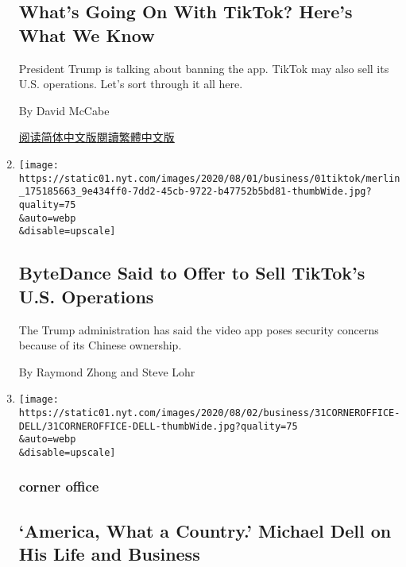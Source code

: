 \begin{enumerate}
{  \subsection{What's Going On With TikTok? Here's What We
  Know}\label{whats-going-on-with-tiktok-heres-what-we-know}}

  President Trump is talking about banning the app. TikTok may also sell
  its U.S. operations. Let's sort through it all here.

  By David McCabe

  \href{https://cn.nytimes.com/technology/20200803/tiktok-trump-microsoft-bytedance-china-ban/}{阅读简体中文版}\href{https://cn.nytimes.com/technology/20200803/tiktok-trump-microsoft-bytedance-china-ban/zh-hant/}{閱讀繁體中文版}
\item
  \href{/2020/08/01/technology/tiktok-sale-trump-ban.html}{}

  \texttt{[image: https://static01.nyt.com/images/2020/08/01/business/01tiktok/merlin\_175185663\_9e434ff0-7dd2-45cb-9722-b47752b5bd81-thumbWide.jpg?quality=75\\\&auto=webp\\\&disable=upscale]}

  \hypertarget{bytedance-said-to-offer-to-sell-tiktoks-us-operations}{%
  \subsection{ByteDance Said to Offer to Sell TikTok's U.S.
  Operations}\label{bytedance-said-to-offer-to-sell-tiktoks-us-operations}}

  The Trump administration has said the video app poses security
  concerns because of its Chinese ownership.

  By Raymond Zhong and Steve Lohr
\item
  \href{/2020/07/31/business/michael-dell-corner-office.html}{}

  \texttt{[image: https://static01.nyt.com/images/2020/08/02/business/31CORNEROFFICE-DELL/31CORNEROFFICE-DELL-thumbWide.jpg?quality=75\\\&auto=webp\\\&disable=upscale]}

  \hypertarget{corner-office}{%
  \subsubsection{corner office}\label{corner-office}}

  \hypertarget{america-what-a-country-michael-dell-on-his-life-and-business}{%
  \subsection{`America, What a Country.' Michael Dell on His Life and
  Business}\label{america-what-a-country-michael-dell-on-his-life-and-business}}


\end{enumerate}
